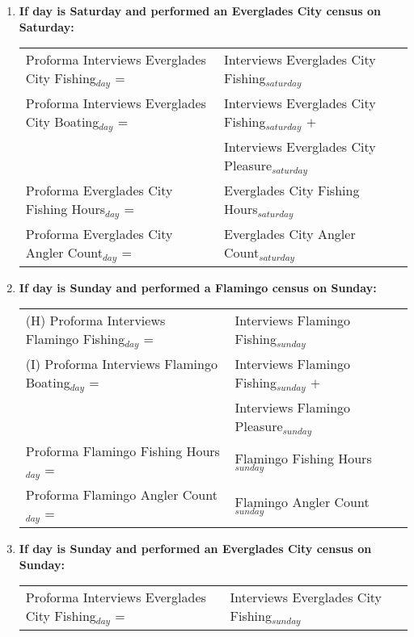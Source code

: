 \documentclass[letterpaper,12pt]{article}
\begin{document}
\begin{enumerate}
\item
\textbf{If day is Saturday and performed an Everglades City census on Saturday:} \\
\begin{tabular}{l@{ }l@{ }l}
	Proforma Interviews Everglades City Fishing$_{day}$ =
		& Interviews Everglades City Fishing$_{saturday}$ \\

	Proforma Interviews Everglades City Boating$_{day}$ =
		& Interviews Everglades City Fishing$_{saturday}$ $+$ \\
		& Interviews Everglades City Pleasure$_{saturday}$ \\

	Proforma Everglades City Fishing Hours$_{day}$ =
		& Everglades City Fishing Hours$_{saturday}$ \\

	Proforma Everglades City Angler Count$_{day}$ =
		& Everglades City Angler Count$_{saturday}$ \\
\end{tabular}

\item
\textbf{If day is Sunday and performed a Flamingo census on Sunday:} \\
\begin{tabular}{l@{ }l@{ }l}
	(H) Proforma Interviews Flamingo Fishing$_{day}$ =
		& Interviews Flamingo Fishing$_{sunday}$ \\

	(I) Proforma Interviews Flamingo Boating$_{day}$ =
		& Interviews Flamingo Fishing$_{sunday}$ $+$ \\
		& Interviews Flamingo Pleasure$_{sunday}$ \\

	Proforma Flamingo Fishing Hours$_{day}$ =
		& Flamingo Fishing Hours$_{sunday}$ \\

	Proforma Flamingo Angler Count$_{day}$ =
		& Flamingo Angler Count$_{sunday}$ \\
\end{tabular}

\item
\textbf{If day is Sunday and performed an Everglades City census on Sunday:} \\
\begin{tabular}{l@{ }l@{ }l}
	Proforma Interviews Everglades City Fishing$_{day}$ =
		& Interviews Everglades City Fishing$_{sunday}$ \\


\end{tabular}
\end{enumerate}
\end{document}
